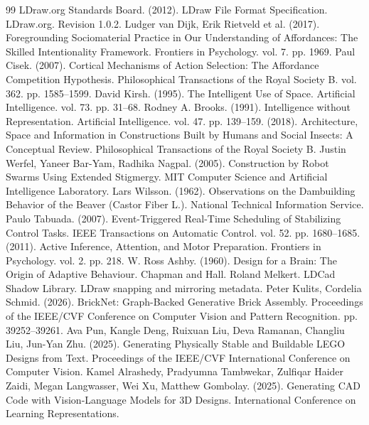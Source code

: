 \documentclass[11pt,a4paper]{article}
\begin{document}
\begin{thebibliography}{99}
 LDraw.org Standards Board. (2012). LDraw File Format Specification. LDraw.org. Revision 1.0.2.
 Ludger van Dijk, Erik Rietveld et al. (2017). Foregrounding Sociomaterial Practice in Our Understanding of Affordances: The Skilled Intentionality Framework. Frontiers in Psychology. vol. 7. pp. 1969.
 Paul Cisek. (2007). Cortical Mechanisms of Action Selection: The Affordance Competition Hypothesis. Philosophical Transactions of the Royal Society B. vol. 362. pp. 1585--1599.
 David Kirsh. (1995). The Intelligent Use of Space. Artificial Intelligence. vol. 73. pp. 31--68.
 Rodney A. Brooks. (1991). Intelligence without Representation. Artificial Intelligence. vol. 47. pp. 139--159.
 (2018). Architecture, Space and Information in Constructions Built by Humans and Social Insects: A Conceptual Review. Philosophical Transactions of the Royal Society B.
 Justin Werfel, Yaneer Bar-Yam, Radhika Nagpal. (2005). Construction by Robot Swarms Using Extended Stigmergy. MIT Computer Science and Artificial Intelligence Laboratory.
 Lars Wilsson. (1962). Observations on the Dambuilding Behavior of the Beaver (Castor Fiber L.). National Technical Information Service.
 Paulo Tabuada. (2007). Event-Triggered Real-Time Scheduling of Stabilizing Control Tasks. IEEE Transactions on Automatic Control. vol. 52. pp. 1680--1685.
 (2011). Active Inference, Attention, and Motor Preparation. Frontiers in Psychology. vol. 2. pp. 218.
 W. Ross Ashby. (1960). Design for a Brain: The Origin of Adaptive Behaviour. Chapman and Hall.
 Roland Melkert. LDCad Shadow Library. LDraw snapping and mirroring metadata.
 Peter Kulits, Cordelia Schmid. (2026). BrickNet: Graph-Backed Generative Brick Assembly. Proceedings of the IEEE/CVF Conference on Computer Vision and Pattern Recognition. pp. 39252--39261.
 Ava Pun, Kangle Deng, Ruixuan Liu, Deva Ramanan, Changliu Liu, Jun-Yan Zhu. (2025). Generating Physically Stable and Buildable LEGO Designs from Text. Proceedings of the IEEE/CVF International Conference on Computer Vision.
 Kamel Alrashedy, Pradyumna Tambwekar, Zulfiqar Haider Zaidi, Megan Langwasser, Wei Xu, Matthew Gombolay. (2025). Generating CAD Code with Vision-Language Models for 3D Designs. International Conference on Learning Representations.

\end{thebibliography}
\end{document}
